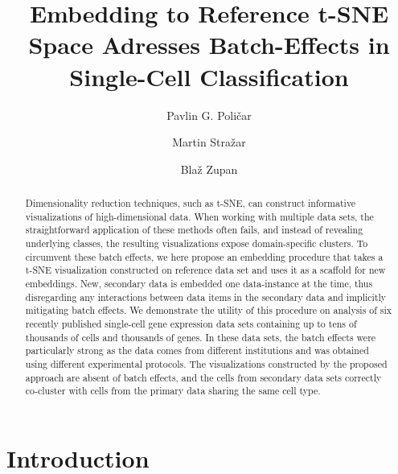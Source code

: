 \documentclass[runningheads]{llncs}
\begin{document}
%
\title{Embedding to Reference t-SNE Space Adresses Batch-Effects in Single-Cell Classification}
%
%
\author{Pavlin G. Poli\v{c}ar \and
Martin Stra\v{z}ar \and
Bla\v{z} Zupan}
%
%

\maketitle

\begin{abstract}
Dimensionality reduction techniques, such as t-SNE, can construct informative visualizations of high-dimensional data. When working with multiple data sets, the straightforward application of these methods often fails, and instead of revealing underlying classes, the resulting visualizations expose domain-specific clusters. To circumvent these batch effects, we here propose an embedding procedure that takes a t-SNE visualization constructed on reference data set and uses it as a scaffold for new embeddings. New, secondary data is embedded one data-instance at the time, thus disregarding any interactions between data items in the secondary data and implicitly mitigating batch effects. We demonstrate the utility of this procedure on analysis of six recently published single-cell gene expression data sets containing up to tens of thousands of cells and thousands of genes. In these data sets, the batch effects were particularly strong as the data comes from different institutions and was obtained using different experimental protocols. The visualizations constructed by the proposed approach are absent of batch effects, and the cells from secondary data sets correctly co-cluster with cells from the primary data sharing the same cell type.

\end{abstract}


\section{Introduction}
\end{document}
